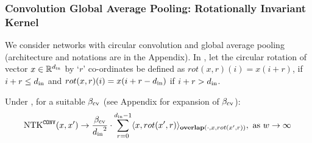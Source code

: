 \subsubsection{Convolution  Global Average Pooling: Rotationally Invariant Kernel}
We consider networks with circular convolution and global average pooling (architecture and notations are in the Appendix). In , let the circular rotation of vector $x\in\mathbb{R}^{d_{\text{in}}}$ by `$r$' co-ordinates be defined as $rot(x,r)(i)=x(i+ r)$, if $i+r \leq d_{\text{in}}$ and $rot(x,r)(i)=x(i+ r-d_{\text{in}})$ if $i+r > d_{\text{in}}$.  %

\begin{theorem}\label{th:conv} Under , for  a suitable $\beta_{\text{cv}}$ (see Appendix for expansion of $\beta_{\text{cv}}$):
\begin{align*}
\text{NTK}^{\texttt{CONV}}(x,x')\rightarrow  \frac{\beta_{\text{cv}}}{{d_{\text{in}}}^2} \cdot \sum_{r=0}^{d_{\text{in}}-1} \langle x,rot(x',r)\rangle_{\textbf{overlap}(\cdot, x,rot(x',r))},\,\, \text{as}\,\,  w\rightarrow\infty\,
\end{align*}
\end{theorem}
